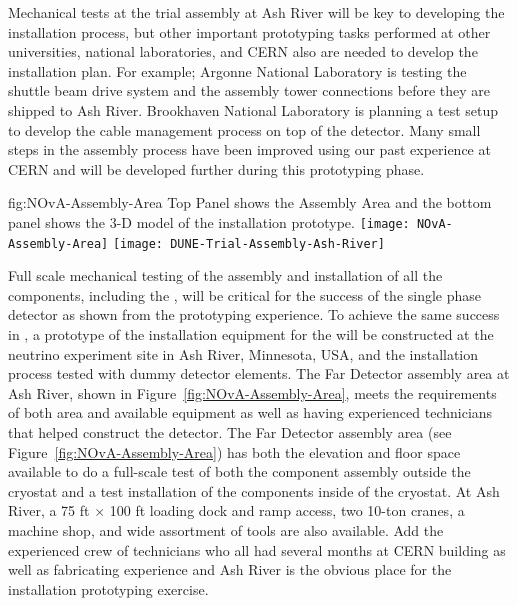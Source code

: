 Mechanical tests at the  trial assembly at Ash River will be key to developing the installation process, but other important prototyping tasks performed at other universities, national laboratories, and CERN also are needed to develop the installation plan. 
For example; Argonne National Laboratory is testing the  shuttle beam drive system and the  assembly tower connections before they are shipped to Ash River.  
Brookhaven National Laboratory is planning a test setup to develop the cable management process on top of the detector.
Many small steps in the assembly process have been improved using our past experience at CERN and will be developed further during this prototyping phase. 


\begin{dunefigure}
{fig:NOvA-Assembly-Area}
{Top Panel shows the \nova Assembly Area and the bottom panel shows the 3-D model of the installation prototype.}                
\texttt{[image: NOvA-Assembly-Area]}
\vspace{-12pt}
\texttt{[image: DUNE-Trial-Assembly-Ash-River]}
\end{dunefigure}

Full scale mechanical testing of the assembly and installation of all the  components, including the , will be critical for the success of the single phase detector as shown from the  prototyping experience. 
To achieve the same success in , a prototype of the installation
equipment for the   will be constructed at the \nova neutrino experiment  site in Ash River, Minnesota, USA, and the installation process tested with dummy detector elements.  
The \nova Far Detector assembly area at Ash River, shown in Figure~\ref{fig:NOvA-Assembly-Area}, meets the requirements of both area and available equipment as well as having experienced technicians that helped construct the  detector. 
The \nova Far Detector assembly area (see Figure~\ref{fig:NOvA-Assembly-Area}) has both the elevation and floor space available to do a full-scale test of both the component assembly outside the cryostat and a test installation of the  components  inside of the  cryostat. 
At Ash River,  a 75 \si{ft} $\times$  100 \si{ft} loading dock and ramp access, two 10-ton cranes, a machine shop, and wide assortment of tools are also available.  Add the experienced crew of technicians who all had several months at CERN building  as well as fabricating experience and Ash River is the obvious place for the  installation prototyping exercise. 

